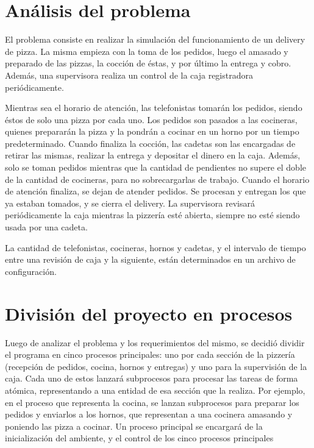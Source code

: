 \documentclass[11pt,spanish,a4paper,openany,notitlepage]{article}
\begin{document}
\newpage
\tableofcontents
\newpage

\section{Análisis del problema}

El problema consiste en realizar la simulación del funcionamiento de un delivery de pizza. La misma 
empieza con la toma de los pedidos, luego el amasado y preparado de las pizzas, la cocción de 
éstas, y por último la entrega y cobro. Además, una supervisora realiza un control de la caja 
registradora periódicamente.

Mientras sea el horario de atención, las telefonistas tomarán los pedidos, siendo éstos de solo una 
pizza por cada uno. Los pedidos son pasados a las cocineras, quienes prepararán la pizza y la 
pondrán a cocinar en un horno por un tiempo predeterminado. Cuando finaliza la cocción, las cadetas 
son las encargadas de retirar las mismas, realizar la entrega y depositar el dinero en la caja. 
Además, solo se toman pedidos mientras que la cantidad de pendientes no supere el doble de la 
cantidad de cocineras, para no sobrecargarlas de trabajo. 
Cuando el horario de atención finaliza, se dejan de atender pedidos. Se procesan y entregan los que 
ya estaban tomados, y se cierra el delivery.
La supervisora revisará periódicamente la caja mientras la pizzería esté abierta, siempre no esté 
siendo usada por una cadeta.

La cantidad de telefonistas, cocineras, hornos y cadetas, y el intervalo de tiempo entre una 
revisión de caja y la siguiente, están determinados en un archivo de configuración.

\newpage

\section{División del proyecto en procesos}

Luego de analizar el problema y los requerimientos del mismo, se decidió dividir el programa en 
cinco procesos principales: uno por cada sección de la pizzería (recepción de pedidos, cocina, 
hornos y entregas) y uno para la supervisión de la caja. Cada uno de estos lanzará subprocesos para 
procesar las tareas de forma atómica, representando a una entidad de esa sección que la realiza. 
Por ejemplo, en el proceso que representa la cocina, se lanzan subprocesos para preparar los 
pedidos y enviarlos a los hornos, que representan a una cocinera amasando y poniendo las pizza a 
cocinar.
Un proceso principal se encargará de la inicialización del ambiente, y el control de los cinco 
procesos principales
\end{document}
